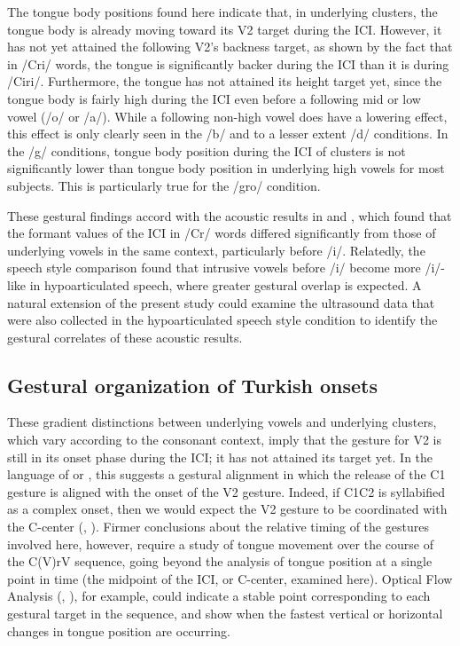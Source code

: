 \documentclass[output=paper,colorlinks,citecolor=brown]{langscibook}
\begin{document}
The tongue body positions found here indicate that, in underlying clusters, the tongue body is already moving toward its V2 target during the ICI. However, it has not yet attained the following V2’s backness target, as shown by the fact that in /Cri/ words, the tongue is significantly backer during the ICI than it is during /Ciri/. Furthermore, the tongue has not attained its height target yet, since the tongue body is fairly high during the ICI even before a following mid or low vowel (/o/ or /a/). While a following non-high vowel does have a lowering effect, this effect is only clearly seen in the /b/ and to a lesser extent /d/ conditions. In the /g/ conditions, tongue body position during the ICI of clusters is not significantly lower than tongue body position in underlying high vowels for most subjects. This is particularly true for the /gro/ condition.

These gestural findings accord with the acoustic results in \citet{Bellik2018} and \citet{Bellik2019b}, which found that the formant values of the ICI in /Cr/ words differed significantly from those of underlying vowels in the same context, particularly before /i/. Relatedly, the speech style comparison \citep{Bellik2019b} found that intrusive vowels before /i/ become more /i/-like in hypoarticulated speech, where greater gestural overlap is expected. A natural extension of the present study could examine the ultrasound data that were also collected in the hypoarticulated speech style condition to identify the gestural correlates of these acoustic results.


\subsection{Gestural organization of Turkish onsets}
\largerpage
These gradient distinctions between underlying vowels and underlying clusters, which vary according to the consonant context, imply that the gesture for V2 is still in its onset phase during the ICI; it has not attained its target yet. In the language of \citet{Gafos2002} or \citet{Hall:2003}, this suggests a gestural alignment in which the release of the C1 gesture is aligned with the onset of the V2 gesture. Indeed, if C1C2 is syllabified as a complex onset, then we would expect the V2 gesture to be coordinated with the C-center (\citealt{Shawetal2009}, \citealt{BrowmanGoldstein1988}). Firmer conclusions about the relative timing of the gestures involved here, however, require a study of tongue movement over the course of the C(V)rV sequence, going beyond the analysis of tongue position at a single point in time (the midpoint of the ICI, or C-center, examined here). Optical Flow Analysis (\citealt{Barbosa2014}, \citealt{Halletal2015}), for example, could indicate a stable point corresponding to each gestural target in the sequence, and show when the fastest vertical or horizontal changes in tongue position are occurring.
\end{document}
